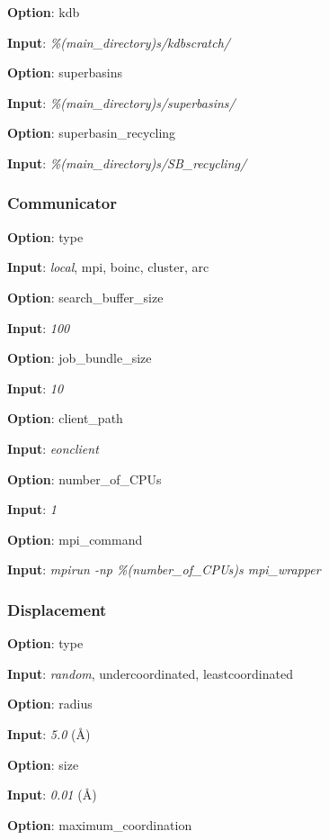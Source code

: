 \documentclass{article}
\begin{document}
\noindent\textbf{Option}:  kdb

\noindent\textbf{Input}:  \emph{\%(main\_directory)s/kdbscratch/}

\noindent\textbf{Option}:  superbasins

\noindent\textbf{Input}:  \emph{\%(main\_directory)s/superbasins/}

\noindent\textbf{Option}:  superbasin\_recycling

\noindent\textbf{Input}:  \emph{\%(main\_directory)s/SB\_recycling/}

\subsubsection{Communicator}

\noindent\textbf{Option}:  type

\noindent\textbf{Input}:  \emph{local}, mpi, boinc, cluster, arc

\noindent\textbf{Option}:  search\_buffer\_size

\noindent\textbf{Input}:  \emph{100}

\noindent\textbf{Option}:  job\_bundle\_size

\noindent\textbf{Input}:  \emph{10}

\noindent\textbf{Option}:  client\_path

\noindent\textbf{Input}:  \emph{eonclient}

\noindent\textbf{Option}:  number\_of\_CPUs

\noindent\textbf{Input}:  \emph{1}

\noindent\textbf{Option}:  mpi\_command

\noindent\textbf{Input}: \emph{mpirun -np \%(number\_of\_CPUs)s mpi\_wrapper}

\subsubsection{Displacement}

\noindent\textbf{Option}:  type

\noindent\textbf{Input}:  \emph{random}, undercoordinated, leastcoordinated

\noindent\textbf{Option}:  radius

\noindent\textbf{Input}:  \emph{5.0} (\AA)

\noindent\textbf{Option}:  size

\noindent\textbf{Input}:  \emph{0.01} (\AA)

\noindent\textbf{Option}:  maximum\_coordination
\end{document}
